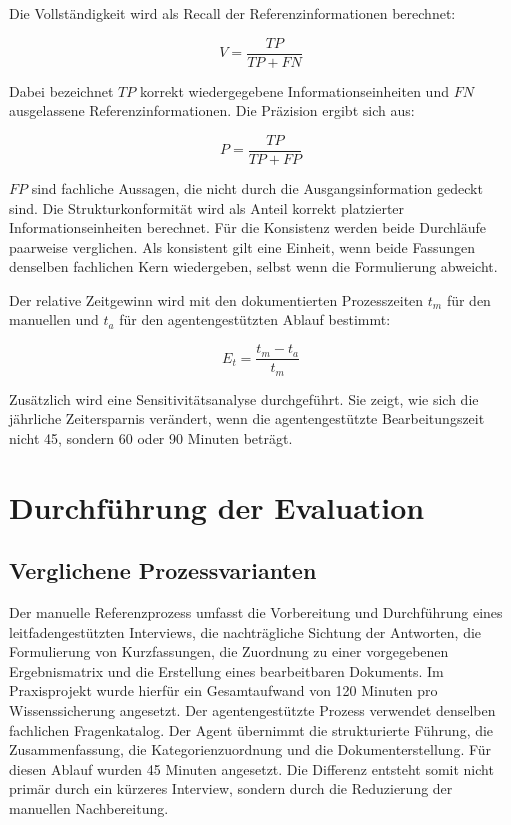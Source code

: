 \documentclass[
  10pt,
  ngerman,
  a4paper,
  toc=graduated,
  numbers=noenddot,
  headings=standardclasses,
  nonumberlist
]{scrartcl}
\begin{document}
Die Vollständigkeit wird als Recall der Referenzinformationen berechnet:

\begin{equation}
V = \frac{TP}{TP + FN}
\end{equation}

Dabei bezeichnet $TP$ korrekt wiedergegebene Informationseinheiten und $FN$ ausgelassene Referenzinformationen. Die Präzision ergibt sich aus:

\begin{equation}
P = \frac{TP}{TP + FP}
\end{equation}

$FP$ sind fachliche Aussagen, die nicht durch die Ausgangsinformation gedeckt sind. Die Strukturkonformität wird als Anteil korrekt platzierter Informationseinheiten berechnet. Für die Konsistenz werden beide Durchläufe paarweise verglichen. Als konsistent gilt eine Einheit, wenn beide Fassungen denselben fachlichen Kern wiedergeben, selbst wenn die Formulierung abweicht.

Der relative Zeitgewinn wird mit den dokumentierten Prozesszeiten $t_m$ für den manuellen und $t_a$ für den agentengestützten Ablauf bestimmt:

\begin{equation}
E_t = \frac{t_m - t_a}{t_m}
\end{equation}

Zusätzlich wird eine Sensitivitätsanalyse durchgeführt. Sie zeigt, wie sich die jährliche Zeitersparnis verändert, wenn die agentengestützte Bearbeitungszeit nicht 45, sondern 60 oder 90 Minuten beträgt.

\section{Durchführung der Evaluation}

\subsection{Verglichene Prozessvarianten}

Der manuelle Referenzprozess umfasst die Vorbereitung und Durchführung eines leitfadengestützten Interviews, die nachträgliche Sichtung der Antworten, die Formulierung von Kurzfassungen, die Zuordnung zu einer vorgegebenen Ergebnismatrix und die Erstellung eines bearbeitbaren Dokuments. Im Praxisprojekt wurde hierfür ein Gesamtaufwand von 120 Minuten pro Wissenssicherung angesetzt. Der agentengestützte Prozess verwendet denselben fachlichen Fragenkatalog. Der Agent übernimmt die strukturierte Führung, die Zusammenfassung, die Kategorienzuordnung und die Dokumenterstellung. Für diesen Ablauf wurden 45 Minuten angesetzt. Die Differenz entsteht somit nicht primär durch ein kürzeres Interview, sondern durch die Reduzierung der manuellen Nachbereitung.
\end{document}
